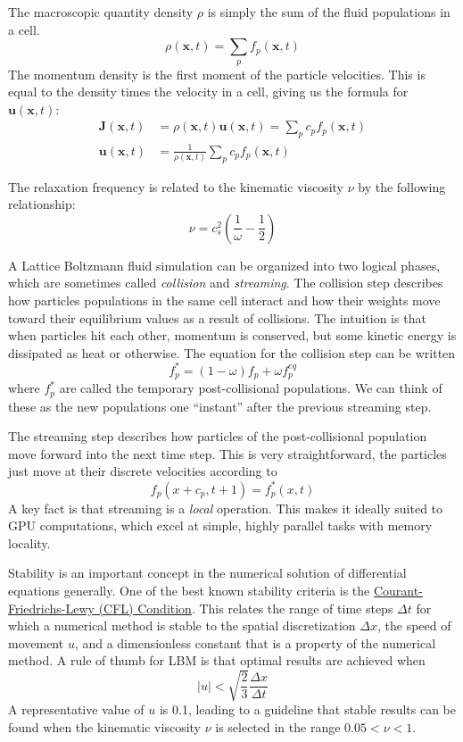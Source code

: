 \documentclass[11pt]{article} %
\renewcommand{\vec}[1]{\mathbf{#1}}
\begin{document}
The macroscopic quantity density $\rho$ is simply the sum of the fluid populations in a cell.
$$\rho(\vec{x}, t) = \sum_{p}f_p(\vec{x}, t)$$
The momentum density is the first moment of the particle velocities.  
This is equal to the density times the velocity in a cell, giving us the formula for $\vec{u}(\vec{x}, t)$:
\begin{align*}
\vec{J}(\vec{x}, t) &= \rho(\vec{x}, t) \vec{u}(\vec{x}, t) = \sum_{p}c_p f_p(\vec{x}, t) \\
\vec{u}(\vec{x}, t) &= \frac{1}{\rho(\vec{x}, t)} \sum_{p}c_p f_p(\vec{x}, t)
\end{align*}

The relaxation frequency is related to the kinematic viscosity $\nu$ by the following relationship:
$$ \nu = c_s^2 \left(\frac{1}{\omega} - \frac{1}{2}\right)$$

A Lattice Boltzmann fluid simulation can be organized into two logical phases, 
which are sometimes called \textit{collision} and \textit{streaming}.
The collision step describes how particles populations in the same cell interact and 
how their weights move toward their equilibrium values as a result of collisions.
The intuition is that when particles hit each other, momentum is conserved, 
but some kinetic energy is dissipated as heat or otherwise.
The equation for the collision step can be written
$$f_p^* = (1-\omega)f_p + \omega f_p^{eq}$$
where $f_p^*$ are called the temporary post-collisional populations.
We can think of these as the new populations one ``instant'' after the previous streaming step.

The streaming step describes how particles of the post-collisional population move forward into the next time step.  
This is very straightforward, the particles just move at their discrete velocities according to
$$f_p(x + c_p, t+ 1) = f_p^*(x, t)$$
A key fact is that streaming is a \textit{local} operation.  
This makes it ideally suited to GPU computations, which excel at simple, highly parallel tasks with memory locality.

Stability is an important concept in the numerical solution of differential equations generally.
One of the best known stability criteria is the 
\href{https://en.wikipedia.org/wiki/Courant%E2%80%93Friedrichs%E2%80%93Lewy_condition}{Courant-Friedrichs-Lewy (CFL) Condition}.
This relates the range of time steps $\Delta t$ for which a numerical method is stable to the spatial discretization $\Delta x$,
the speed of movement $u$, and a dimensionless constant that is a property of the numerical method.
A rule of thumb for LBM is that optimal results are achieved when 
$$|u| < \sqrt{\frac{2}{3}} \frac{\Delta x}{\Delta t}$$
A representative value of $u$ is 0.1, leading to a guideline that stable results can be found when the
kinematic viscosity $\nu$ is selected in the range $0.05 < \nu < 1$.
\end{document}
